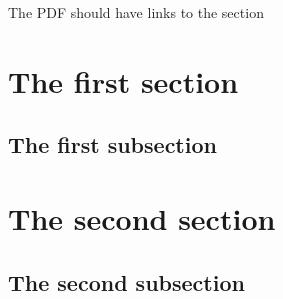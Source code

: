 \documentclass[11pt,letterpaper]{article}
\begin{document}
The PDF should have links to the section

\section{The first section}
\lipsum[1-2]

\subsection{The first subsection}
\lipsum[1-2]

\section{The second section}
\lipsum[1-2]

\subsection{The second subsection}
\lipsum[1-2]
\end{document}
